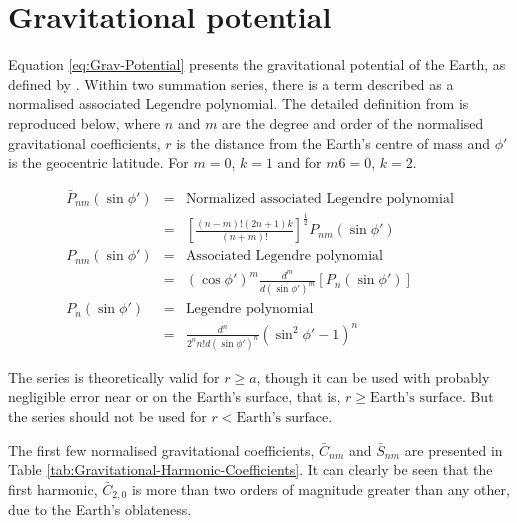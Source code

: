 \chapter{Gravitational potential} \label{cha:Gravitational-potential}

Equation \ref{eq:Grav-Potential} presents the gravitational potential of the Earth, as defined by \citet{WGS84}. Within two summation series, there is a term described as a normalised associated Legendre polynomial. The detailed definition from \citet{WGS84} is reproduced below, where \(n\) and \(m\) are the degree and order of the normalised gravitational coefficients, \(r\) is the distance from the Earth’s centre of mass and \(\phi'\) is the geocentric latitude. For \(m = 0\), \(k = 1\) and for \(m 6= 0\), \(k = 2\).

\begin{eqnarray}
\bar{P}_{nm}\left(\sin\phi'\right) & = & \text{Normalized associated Legendre polynomial}\\
 & = & \left[\frac{\left(n-m\right)!\left(2n+1\right)k}{\left(n+m\right)!}\right]^{\frac{1}{2}}P_{nm}\left(\sin\phi'\right)\\
P_{nm}\left(\sin\phi'\right) & = & \text{Associated Legendre polynomial}\\
 & = & \left(\cos\phi'\right)^{m}\frac{d^{m}}{d\left(\sin\phi'\right)^{m}}\left[P_{n}\left(\sin\phi'\right)\right]\\
P_{n}\left(\sin\phi'\right) & = & \text{Legendre polynomial}\\
 & = & \frac{d^{n}}{2^{n}n!d\left(\sin\phi'\right)^{n}}\left(\sin^{2}\phi'-1\right)^{n}
\end{eqnarray}

The series is theoretically valid for \(r\geq a\), though it can be used with probably negligible error near or on the Earth's surface, that is, \(r\geq\text{Earth's surface}\). But the series should not be used for \(r<\text{Earth's surface}\).

The first few normalised gravitational coefficients, \(\bar{C}_{nm}\) and \(\bar{S}_{nm}\) are presented in Table \ref{tab:Gravitational-Harmonic-Coefficients}. It can clearly be seen that the first harmonic, \(\bar{C}_{2,0}\) is more than two orders of magnitude greater than any other, due to the Earth’s oblateness.

